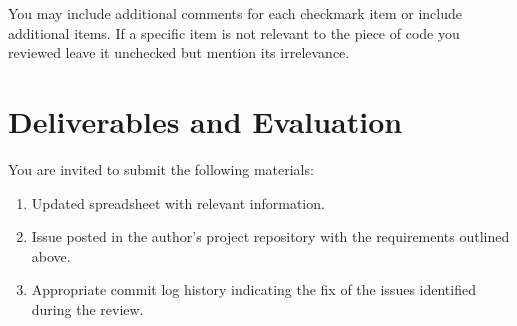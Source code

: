 \documentclass[11pt]{article}
\begin{document}
You may include additional comments for each checkmark item or include additional items. If a specific item is not relevant to the piece of code you reviewed leave it unchecked but mention its irrelevance.


\section*{Deliverables and Evaluation}

You are invited to submit the following materials:
\begin{enumerate}

	\item Updated spreadsheet with relevant information.
	\item Issue posted in the author's project repository with the requirements outlined above.
	\item Appropriate commit log history indicating the fix of the  issues identified during the review.
\end{enumerate}
\end{document}
